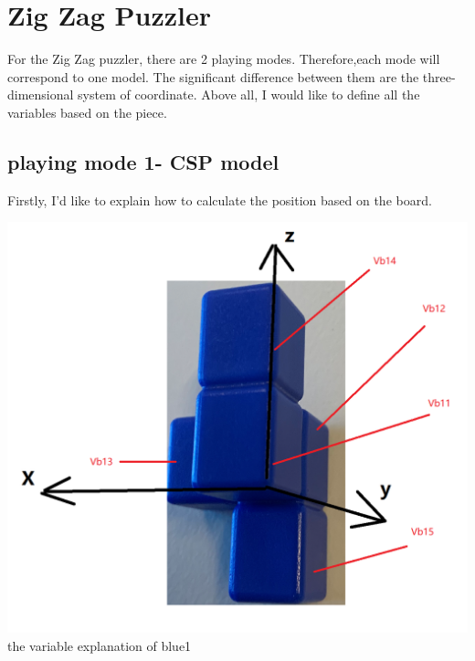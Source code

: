 \chapter{Zig Zag Puzzler}
For the Zig Zag puzzler, there are 2 playing modes. Therefore,each mode will correspond to one model. The significant difference between them are the three-dimensional system of coordinate.
Above all, I would like to define all the variables based on the piece.
\section{playing mode 1- CSP model}
\label{sec:CSP model1}
Firstly, I'd like to explain how to calculate the position based on the board.
\begin{center}
\includegraphics[scale=0.5]{game2blue1.png}\\
the variable explanation of blue1\\
\end{center}
